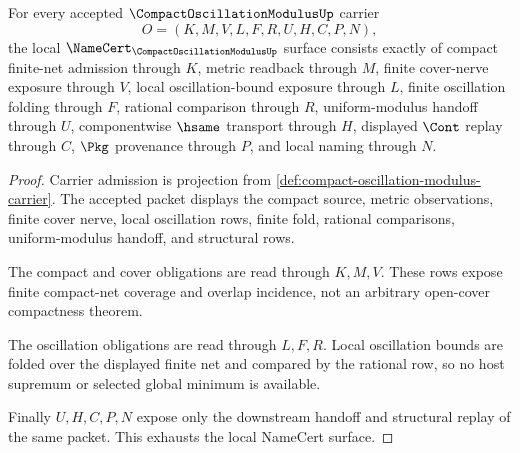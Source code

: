 \begin{theorem}
\label{thm:compact-oscillation-modulus-namecert-obligations}
For every accepted $\CompactOscillationModulusUp$ carrier
$$
O=(K,M,V,L,F,R,U,H,C,P,N),
$$
the local $\NameCert_{\CompactOscillationModulusUp}$ surface consists exactly of compact finite-net admission through $K$, metric readback through $M$, finite cover-nerve exposure through $V$, local oscillation-bound exposure through $L$, finite oscillation folding through $F$, rational comparison through $R$, uniform-modulus handoff through $U$, componentwise $\hsame$ transport through $H$, displayed $\Cont$ replay through $C$, $\Pkg$ provenance through $P$, and local naming through $N$.
\end{theorem}
\begin{proof}
Carrier admission is projection from \autoref{def:compact-oscillation-modulus-carrier}. The accepted packet displays the compact source, metric observations, finite cover nerve, local oscillation rows, finite fold, rational comparisons, uniform-modulus handoff, and structural rows.

The compact and cover obligations are read through $K,M,V$. These rows expose finite compact-net coverage and overlap incidence, not an arbitrary open-cover compactness theorem.

The oscillation obligations are read through $L,F,R$. Local oscillation bounds are folded over the displayed finite net and compared by the rational row, so no host supremum or selected global minimum is available.

Finally $U,H,C,P,N$ expose only the downstream handoff and structural replay of the same packet. This exhausts the local NameCert surface.
\end{proof}

